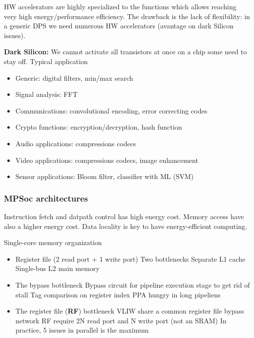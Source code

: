 HW accelerators are highly specialized to the functions which allows reaching very high energy/performance efficiency. The drawback is the lack of flexibility: in a generic DPS we need numerous HW accelerators (avantage on dark Silicon issues).

\textbf{Dark Silicon:} We cannot activate all transistors at once on a chip some need to stay off.
\bigbreak
Typical application
\begin{itemize}
  \item Generic: digital filters, min/max search
  \item Signal analysis: FFT
  \item Communications: convolutional encoding, error correcting codes
  \item Crypto functions: encryption/decryption, hash function
  \item Audio applications: compressions codecs
  \item Video applications: compressions codecs, image enhancement
  \item Sensor applications: Bloom filter, classifier with ML (SVM)
\end{itemize}

\subsubsection{MPSoc architectures}
Instruction fetch and datpath control has high energy cost. Memory access have also a higher energy cost. Data locality is key to have energy-efficient computing.



Single-core memory organization
\begin{itemize}
  \item Register file (2 read port + 1 write port)
    \subitem Two bottlenecks
    \subitem Separate L1 cache
    \subitem Single-bus L2 main memory
  \item The bypass bottleneck
    \subitem Bypass circuit for pipeline execution stage to get rid of stall
    \subitem Tag comparison on register index
    \subitem PPA hungry in long pipeliens
  \item The register file (\textbf{RF}) bottleneck
    \subitem VLIW share a common register file bypass network
    \subitem RF require 2N read port and N write port (not an SRAM)
    \subitem In practice, 5 issues in parallel is the maximum
\end{itemize}

